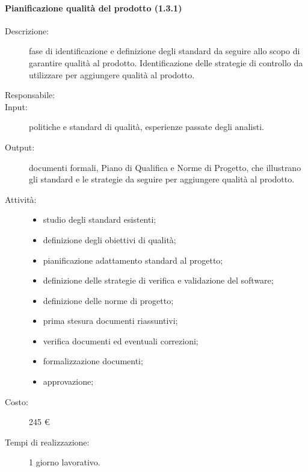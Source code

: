 \paragraph{Pianificazione qualit\`{a} del prodotto (1.3.1)}
\begin{description}
\item[Descrizione:] fase di identificazione e definizione degli standard da seguire allo scopo di garantire qualit\`{a} al prodotto. Identificazione delle strategie di controllo da utilizzare per aggiungere qualit\`{a} al prodotto.
\item[Responsabile:] 
\item[Input:] politiche e standard di qualit\`{a}, esperienze passate degli analisti.
\item[Output:] documenti formali, Piano di Qualifica e Norme di Progetto, che illustrano gli standard e le strategie da seguire per aggiungere qualit\`{a} al prodotto.
\item[Attivit\`{a}:] 
\begin{center}
\begin{itemize}
\item studio degli standard esistenti;
\item definizione degli obiettivi di qualit\`{a};
\item pianificazione adattamento standard al progetto;
\item definizione delle strategie di verifica e validazione del software;
\item definizione delle norme di progetto;
\item prima stesura documenti riassuntivi;
\item verifica documenti ed eventuali correzioni;
\item formalizzazione documenti;
\item approvazione;
\end{itemize}
\end{center}
\item[Costo:] 245 \euro{}
\item[Tempi di realizzazione:] 1 giorno lavorativo.
\end{description}


